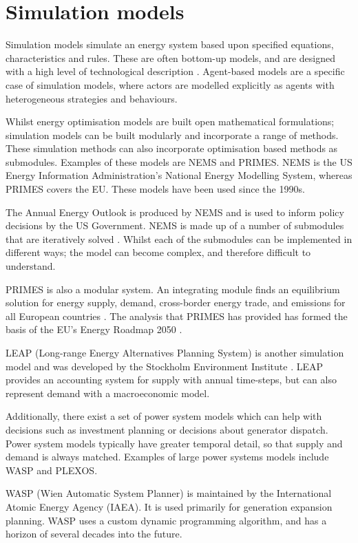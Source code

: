 \section{Simulation models}
\label{sec:litreview:simulation}

Simulation models simulate an energy system based upon specified equations, characteristics and rules. These are often bottom-up models, and are designed with a high level of technological description \cite{Ringkjob2018}. Agent-based models are a specific case of simulation models, where actors are modelled explicitly as agents with heterogeneous strategies and behaviours.

Whilst energy optimisation models are built open mathematical formulations; simulation models can be built modularly and incorporate a range of methods. These simulation methods can also incorporate optimisation based methods as submodules. Examples of these models are NEMS and PRIMES. NEMS is the US Energy Information Administration's National Energy Modelling System, whereas PRIMES covers the EU. These models have been used since the 1990s.

The Annual Energy Outlook is produced by NEMS and is used to inform policy decisions by the US Government. NEMS is made up of a number of submodules that are iteratively solved \cite{Gabriel2001}. Whilst each of the submodules can be implemented in different ways; the model can become complex, and therefore difficult to understand. 

PRIMES is also a modular system. An integrating module finds an equilibrium solution for energy supply, demand, cross-border energy trade, and emissions for all European countries \cite{Capros2012}. The analysis that PRIMES has provided has formed the basis of the EU's Energy Roadmap 2050 \cite{Gupta2011}.

LEAP (Long-range Energy Alternatives Planning System) is another simulation model and was developed by the Stockholm Environment Institute \cite{LEAP2012a}. LEAP provides an accounting system for supply with annual time-steps, but can also represent demand with a macroeconomic model. 

Additionally, there exist a set of power system models which can help with decisions such as investment planning or decisions about generator dispatch. Power system models typically have greater temporal detail, so that supply and demand is always matched. Examples of large power systems models include WASP and PLEXOS.

WASP (Wien Automatic System Planner) is maintained by the International Atomic Energy Agency (IAEA). It is used primarily for generation expansion planning. WASP uses a custom dynamic programming algorithm, and has a horizon of several decades into the future. 

